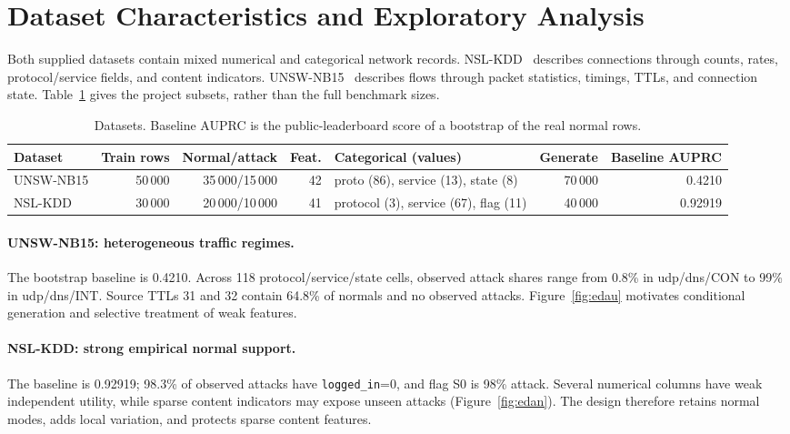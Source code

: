\documentclass[10pt,a4paper]{article}
\begin{document}
\section{Dataset Characteristics and Exploratory Analysis}\label{sec:eda}
Both supplied datasets contain mixed numerical and categorical network records. NSL-KDD~\cite{nsl} describes connections through counts, rates, protocol/service fields, and content indicators. UNSW-NB15~\cite{unsw} describes flows through packet statistics, timings, TTLs, and connection state. Table~\ref{tab:data} gives the project subsets, rather than the full benchmark sizes.
\begin{table}[H]\centering\small
\begin{tabular}{lrrrp{2.8cm}rr}\toprule
Dataset & Train rows & Normal/attack & Feat. & Categorical (values) & Generate & Baseline AUPRC\\\midrule
UNSW-NB15 & 50\,000 & 35\,000/15\,000 & 42 & proto (86), service (13), state (8) & 70\,000 & 0.4210\\
NSL-KDD & 30\,000 & 20\,000/10\,000 & 41 & protocol (3), service (67), flag (11) & 40\,000 & 0.92919\\\bottomrule
\end{tabular}
\caption{Datasets. Baseline AUPRC is the public-leaderboard score of a bootstrap of the real normal rows.}\label{tab:data}
\end{table}
\paragraph{UNSW-NB15: heterogeneous traffic regimes.}
The bootstrap baseline is 0.4210. Across 118 protocol/service/state cells, observed attack shares range from 0.8\% in udp/dns/CON to 99\% in udp/dns/INT. Source TTLs 31 and 32 contain 64.8\% of normals and no observed attacks. Figure~\ref{fig:edau} motivates conditional generation and selective treatment of weak features.

\paragraph{NSL-KDD: strong empirical normal support.}
The baseline is 0.92919; 98.3\% of observed attacks have \texttt{logged\_\allowbreak in}=0, and flag S0 is 98\% attack. Several numerical columns have weak independent utility, while sparse content indicators may expose unseen attacks (Figure~\ref{fig:edan}). The design therefore retains normal modes, adds local variation, and protects sparse content features.
\end{document}
